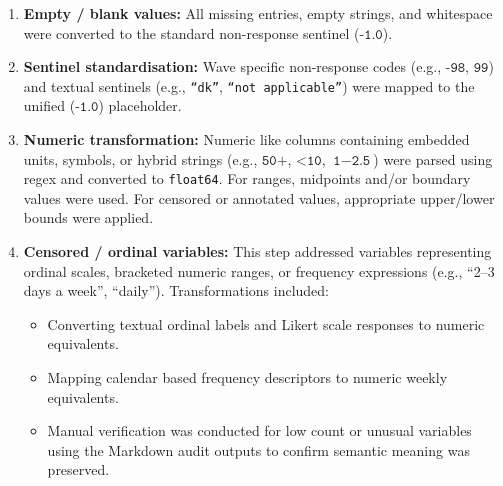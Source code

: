 \begin{enumerate}
    \item \textbf{Empty / blank values:} All missing entries, empty strings, and whitespace were converted to the standard non-response sentinel ($\texttt{-1.0}$).
    
    \item \textbf{Sentinel standardisation:} Wave specific non-response codes (e.g., $\texttt{-98}$, $\texttt{99}$) and textual sentinels (e.g., \texttt{``dk''}, \texttt{``not applicable''}) were mapped to the unified ($\texttt{-1.0}$) placeholder.

    \item \textbf{Numeric transformation:} Numeric like columns containing embedded units, symbols, or hybrid strings (e.g., $\texttt{50+}$, $\texttt{<10}$, $\texttt{1$-$2.5}$) were parsed using regex and converted to \texttt{float64}. For ranges, midpoints and/or boundary values were used. For censored or annotated values, appropriate upper/lower bounds were applied. 

    \item \textbf{Censored / ordinal variables:} This step addressed variables representing ordinal scales, bracketed numeric ranges, or frequency expressions (e.g., ``2--3 days a week'', ``daily''). Transformations included:
    \begin{itemize}
        \item[-] Converting textual ordinal labels and Likert scale responses to numeric equivalents.  
        \item[-] Mapping calendar based frequency descriptors to numeric weekly equivalents.  
        \item[-] Manual verification was conducted for low count or unusual variables using the Markdown audit outputs to confirm semantic meaning was preserved.  
    \end{itemize}


\end{enumerate}
